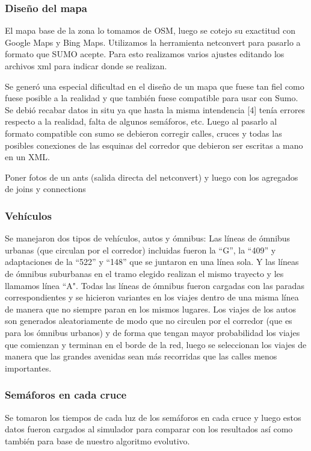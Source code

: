 \subsubsection{Diseño del mapa}
El mapa base de la zona lo tomamos de OSM, luego se cotejo su exactitud con Google Maps y Bing Maps.
Utilizamos la herramienta netconvert para pasarlo a formato que SUMO acepte. 
Para esto realizamos varios ajustes editando los archivos xml para indicar donde se realizan.

Se generó una especial dificultad en el diseño de un mapa que
fuese tan fiel como fuese posible a la realidad y que también
fuese compatible para usar con  Sumo. Se debió recabar datos
in  situ  ya  que  hasta  la  misma  intendencia  [4]  tenía  errores
respecto a la realidad, falta de algunos semáforos, etc. Luego al
pasarlo  al  formato  compatible  con  sumo  se  debieron  corregir
calles,  cruces  y  todas las  posibles  conexiones de  las  esquinas
del corredor que debieron ser escritas a mano en un XML.

Poner fotos de un ants (salida directa del netconvert) y luego con los agregados de joins y connections


\subsubsection{Vehículos}
Se manejaron dos tipos de vehículos, autos y ómnibus:
Las  líneas  de  ómnibus  urbanas  (que  circulan  por  el
corredor)  incluidas  fueron  la  “G”,  la  “409”  y
adaptaciones  de  la  “522”  y  “148”  que  se  juntaron  en
una  línea  sola. Y  las líneas de ómnibus suburbanas en
el  tramo  elegido  realizan  el  mismo  trayecto  y  les
llamamos  línea  “A".  Todas  las  líneas  de  ómnibus
fueron cargadas con las paradas correspondientes y se
hicieron  variantes  en  los  viajes  dentro  de  una  misma
línea de manera que no siempre paran en los mismos
lugares.
Los  viajes  de  los  autos  son  generados  aleatoriamente
de modo que no circulen por el corredor (que es para
los  ómnibus  urbanos)  y  de  forma  que  tengan  mayor
probabilidad los viajes que comienzan y terminan en el
borde  de  la  red,  luego  se  seleccionan  los  viajes  de
manera  que  las  grandes  avenidas  sean  más  recorridas
que  las  calles  menos  importantes.

\subsubsection{Semáforos en cada cruce}
Se  tomaron  los  tiempos  de  cada  luz  de  los  semáforos  en
cada  cruce  y  luego  estos  datos  fueron  cargados  al  simulador
para comparar con los  resultados  así como también para base
de nuestro algoritmo evolutivo.

